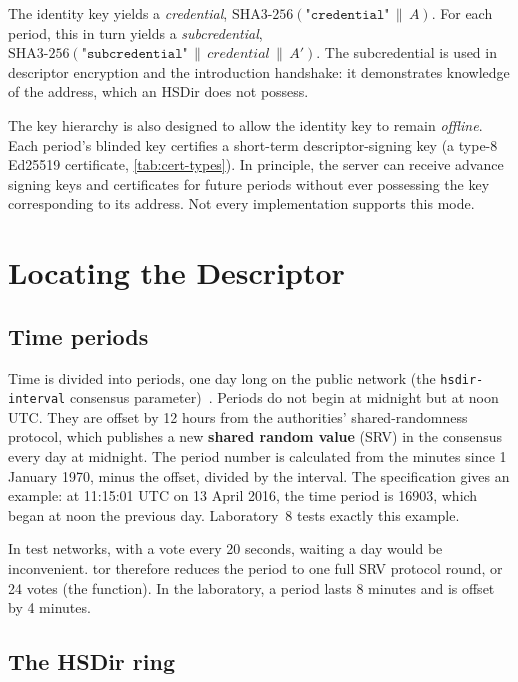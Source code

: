 The identity key yields a \emph{credential}, $\mathrm{SHA3\text{-}256}(\texttt{"credential"} \,\|\, A)$. For each period, this in turn yields a \emph{subcredential}, $\mathrm{SHA3\text{-}256}(\texttt{"subcredential"} \,\|\, \mathit{credential} \,\|\, A')$. The subcredential is used in descriptor encryption and the introduction handshake: it demonstrates knowledge of the address, which an HSDir does not possess.

The key hierarchy is also designed to allow the identity key to remain \emph{offline}. Each period's blinded key certifies a short-term descriptor-signing key (a type-8 Ed25519 certificate, \cref{tab:cert-types}). In principle, the server can receive advance signing keys and certificates for future periods without ever possessing the key corresponding to its address. Not every implementation supports this mode.

\section{Locating the Descriptor}\label{sec:os-hsdir}

\subsection{Time periods}

Time is divided into periods, one day long on the public network (the \texttt{hsdir-interval} consensus parameter)~. Periods do not begin at midnight but at noon UTC. They are offset by 12 hours from the authorities' shared-randomness protocol, which publishes a new \textbf{shared random value} (SRV) in the consensus every day at midnight. The period number is calculated from the minutes since 1 January 1970, minus the offset, divided by the interval. The specification gives an example: at 11:15:01 UTC on 13 April 2016, the time period is 16903, which began at noon the previous day. Laboratory~8 tests exactly this example.

In test networks, with a vote every 20 seconds, waiting a day would be inconvenient. tor therefore reduces the period to one full SRV protocol round, or 24 votes (the  function). In the laboratory, a period lasts 8 minutes and is offset by 4 minutes.

\subsection{The HSDir ring}

